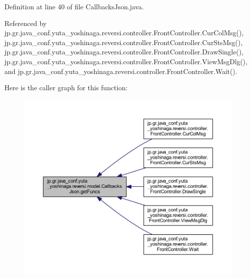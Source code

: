 Definition at line 40 of file Callbacks\+Json.\+java.



Referenced by jp.\+gr.\+java\+\_\+conf.\+yuta\+\_\+yoshinaga.\+reversi.\+controller.\+Front\+Controller.\+Cur\+Col\+Msg(), jp.\+gr.\+java\+\_\+conf.\+yuta\+\_\+yoshinaga.\+reversi.\+controller.\+Front\+Controller.\+Cur\+Sts\+Msg(), jp.\+gr.\+java\+\_\+conf.\+yuta\+\_\+yoshinaga.\+reversi.\+controller.\+Front\+Controller.\+Draw\+Single(), jp.\+gr.\+java\+\_\+conf.\+yuta\+\_\+yoshinaga.\+reversi.\+controller.\+Front\+Controller.\+View\+Msg\+Dlg(), and jp.\+gr.\+java\+\_\+conf.\+yuta\+\_\+yoshinaga.\+reversi.\+controller.\+Front\+Controller.\+Wait().

Here is the caller graph for this function\+:\nopagebreak
\begin{figure}[H]
\begin{center}
\leavevmode
\includegraphics[width=350pt]{classjp_1_1gr_1_1java__conf_1_1yuta__yoshinaga_1_1reversi_1_1model_1_1_callbacks_json_af9a62a3dbe6416793c01d7a0f69da2b1_icgraph}
\end{center}
\end{figure}
\mbox{\label{classjp_1_1gr_1_1java__conf_1_1yuta__yoshinaga_1_1reversi_1_1model_1_1_callbacks_json_a6de1fc00c131167b4fe6231a660bdb6e}} 
